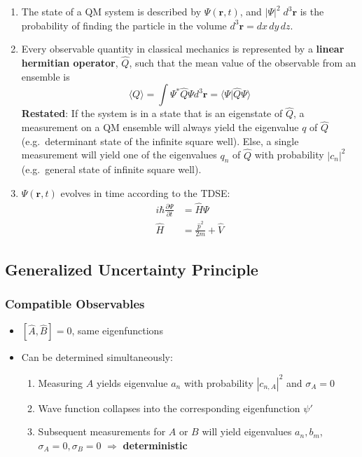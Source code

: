 \begin{enumerate}
    \item The state of a QM system is described by $\Psi(\mathbf{r},t)$, and $|\Psi|^2\; d^3 \mathbf{r}$ is the probability of finding the particle in the volume $d^3 \mathbf{r} = dx\,dy\,dz$.
    \item Every observable quantity in classical mechanics is represented by a \textbf{linear hermitian operator}, $\hat{Q}$, such that the mean value of the observable from an ensemble is
          \noindent\begin{equation*}
              \langle Q\rangle=\int\Psi^{*}\hat{Q}\Psi d^{3} \mathbf{r}= \langle\Psi|\hat{Q}\Psi\rangle
          \end{equation*}\newline
          \textbf{Restated}:\newline
          If the system is in a state that is an eigenstate of $\hat{Q}$, a measurement on a QM ensemble will always yield the eigenvalue $q$ of $\hat{Q}$ (e.g.\ determinant state of the infinite square well).\newline
          Else, a single measurement will yield one of the eigenvalues $q_n$ of $\hat{Q}$ with probability $|c_n|^2$ (e.g.\ general state of infinite square well).
    \item $\Psi(\mathbf{r},t)$ evolves in time according to the TDSE:
          \noindent\begin{align*}
              i\hbar \frac{\partial \Psi}{\partial t} & =\hat{H}\Psi                     \\
              \hat{H}                                 & = \frac{\hat{p}^2}{2m} + \hat{V}
          \end{align*}
\end{enumerate}

\subsection{Generalized Uncertainty Principle}
\subsubsection{Compatible Observables}

\begin{itemize}
    \item $[\widehat{A}, \widehat{B}] = 0$, same eigenfunctions
    \item Can be determined simultaneously:
          \begin{enumerate}
              \item Measuring $A$ yields eigenvalue $a_n$ with probability $|c_{n,A}|^2$ and $\sigma_A=0$
              \item Wave function collapses into the corresponding eigenfunction $\psi'$
              \item Subsequent measurements for $A$ or $B$ will yield eigenvalues $a_n, b_m$, $\sigma_A=0, \sigma_B=0$ $\Rightarrow$ \textbf{deterministic}
          \end{enumerate}
\end{itemize}

